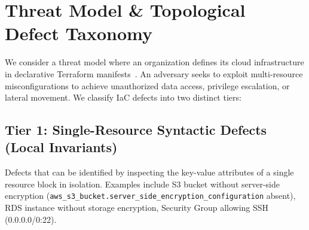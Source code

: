 \documentclass[conference]{IEEEtran}
\begin{document}
\section{Threat Model \& Topological Defect Taxonomy}

We consider a threat model where an organization defines its cloud infrastructure in declarative Terraform manifests~\cite{cis_aws, nist_sp800_53, shostack2014}. An adversary seeks to exploit multi-resource misconfigurations to achieve unauthorized data access, privilege escalation, or lateral movement. We classify IaC defects into two distinct tiers:

\subsection{Tier 1: Single-Resource Syntactic Defects (Local Invariants)}
Defects that can be identified by inspecting the key-value attributes of a single resource block in isolation.
Examples include S3 bucket without server-side encryption (\texttt{aws\_s3\_bucket.server\_side\_encryption\_configuration} absent), RDS instance without storage encryption, Security Group allowing SSH (0.0.0.0/0:22).
\end{document}
